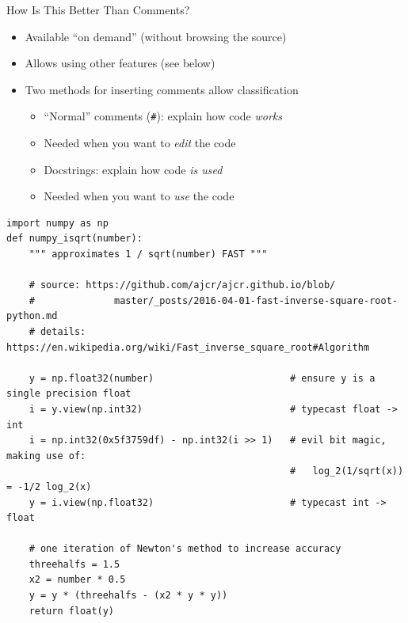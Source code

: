 
\begin{frame}{How Is This Better Than Comments?}
%
\begin{itemize}
\item Available \enquote{on demand} (without browsing the source)
\item Allows using other features (see below)
\item Two methods for inserting comments allow classification
	\begin{itemize}
	\item \enquote{Normal} comments (\texttt{\#}): explain how code \emph{works}
	\item[\Thus] Needed when you want to \emph{edit} the code
	\item Docstrings: explain how code \emph{is used}
	\item[\Thus] Needed when you want to \emph{use} the code
	\end{itemize}
\end{itemize}
%
\end{frame}


\begin{frame}[fragile]
%
\begin{codebox}
\begin{verbatim}
import numpy as np
def numpy_isqrt(number):
    """ approximates 1 / sqrt(number) FAST """
    
    # source: https://github.com/ajcr/ajcr.github.io/blob/
    #              master/_posts/2016-04-01-fast-inverse-square-root-python.md
    # details: https://en.wikipedia.org/wiki/Fast_inverse_square_root#Algorithm
    
    y = np.float32(number)                        # ensure y is a single precision float    
    i = y.view(np.int32)                          # typecast float -> int
    i = np.int32(0x5f3759df) - np.int32(i >> 1)   # evil bit magic, making use of:
                                                  #   log_2(1/sqrt(x)) = -1/2 log_2(x)
    y = i.view(np.float32)                        # typecast int -> float
    
    # one iteration of Newton's method to increase accuracy
    threehalfs = 1.5
    x2 = number * 0.5
    y = y * (threehalfs - (x2 * y * y))
    return float(y)
\end{verbatim}
\end{codebox}
%
\end{frame}

